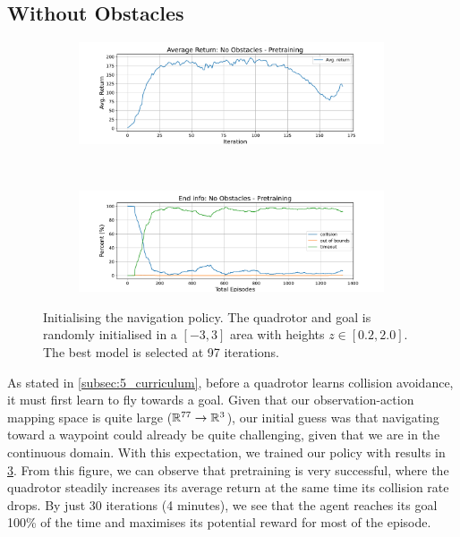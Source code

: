 \subsection{Without Obstacles}
\begin{figure}[H]
    \centering
    \begin{subfigure}[b]{\textwidth}
        \centering
        \captionsetup{justification=centering}
        \includegraphics[width=0.99\textwidth]{figures/7_/3DCarModel_BodyObs_0_NewObs_v0_reward.pdf}
        \label{fig:0_obst_pretraining_rew}
    \end{subfigure} \\
    \begin{subfigure}[b]{\textwidth}
        \centering
        \captionsetup{justification=centering}
        \includegraphics[width=0.99\textwidth]{figures/7_/3DCarModel_BodyObs_0_NewObs_v0_end_info.pdf}
        \label{fig:0_obst_pretraining_end}
    \end{subfigure} 
    \caption{Initialising the navigation policy. The quadrotor and goal is randomly initialised in a $[-3,3]$ area with heights $z \in [0.2, 2.0]$. The best model is selected at 97 iterations.}
    \label{fig:7_train_pretraining_no_obst}
\end{figure}
As stated in \cref{subsec:5_curriculum}, before a quadrotor learns collision avoidance, it must first learn to fly towards a goal. Given that our observation-action mapping space is quite large ($\mathbb{R}^{77} \rightarrow \mathbb{R}^{3}$), our initial guess was that navigating toward a waypoint could already be quite challenging, given that we are in the continuous domain. 
With this expectation, we trained our policy with results in \cref{fig:7_train_pretraining_no_obst}.
From this figure, we can observe that pretraining is very successful, where the quadrotor steadily increases its average return at the same time its collision rate drops. By just 30 iterations (4 minutes), we see that the agent reaches its goal 100\% of the time and maximises its potential reward for most of the episode.

